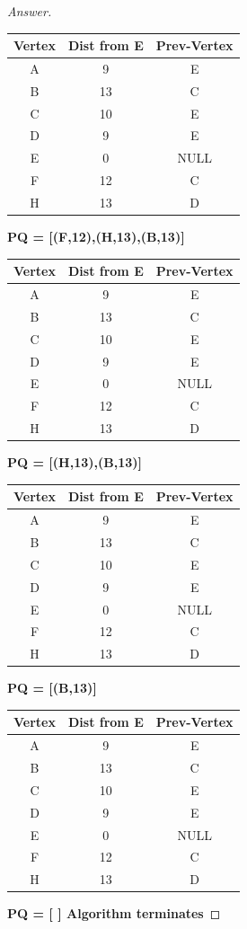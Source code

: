 \documentclass[11pt]{article}
\theoremstyle{definition}
\theoremstyle{definition}
\theoremstyle{definition}
\begin{document}
\begin{proof}[Answer]
\begin{center}
\begin{tabular}[c]{|c|c|c|} 
	Vertex &Dist from E &Prev-Vertex \\\hline
	A & 9  & E\\
	B &13 & C\\
	C & 10 & E\\
	D &9 & E\\
	E & 0& NULL\\
	F &12 & C\\
	H &13 & D\\
\end{tabular}
\end{center}	
\textbf{PQ = [(F,12),(H,13),(B,13)]}

\begin{center}
\begin{tabular}[c]{|c|c|c|} 
	Vertex &Dist from E &Prev-Vertex \\\hline
	A & 9  & E\\
	B &13 & C\\
	C & 10 & E\\
	D &9 & E\\
	E & 0& NULL\\
	F &12 & C\\
	H &13 & D\\
\end{tabular}
\end{center}	
\textbf{PQ = [(H,13),(B,13)]}

\begin{center}
\begin{tabular}[c]{|c|c|c|} 
	Vertex &Dist from E &Prev-Vertex \\\hline
	A & 9  & E\\
	B &13 & C\\
	C & 10 & E\\
	D &9 & E\\
	E & 0& NULL\\
	F &12 & C\\
	H &13 & D\\
\end{tabular}
\end{center}	
\textbf{PQ = [(B,13)]}

\begin{center}
\begin{tabular}[c]{|c|c|c|} 
	Vertex &Dist from E &Prev-Vertex \\\hline
	A & 9  & E\\
	B &13 & C\\
	C & 10 & E\\
	D &9 & E\\
	E & 0& NULL\\
	F &12 & C\\
	H &13 & D\\
\end{tabular}
\end{center}	
\textbf{PQ = [ ] Algorithm terminates}

\end{proof}
\end{document}
